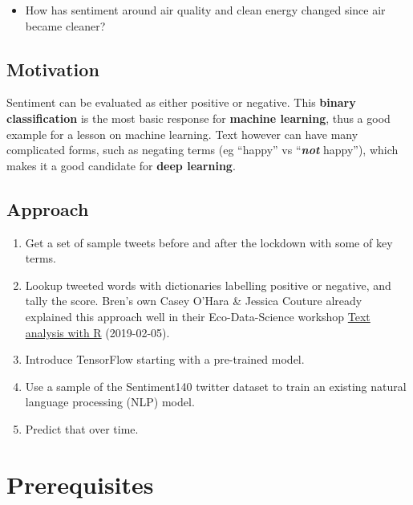 \documentclass[]{book}
\providecommand{\tightlist}{%
  \setlength{\itemsep}{0pt}\setlength{\parskip}{0pt}}
\begin{document}
\begin{itemize}
\tightlist
\item
  How has sentiment around air quality and clean energy changed since air became cleaner?
\end{itemize}

\hypertarget{motivation-1}{%
\subsection*{Motivation}\label{motivation-1}}

Sentiment can be evaluated as either positive or negative. This \textbf{binary classification} is the most basic response for \textbf{machine learning}, thus a good example for a lesson on machine learning. Text however can have many complicated forms, such as negating terms (eg ``happy'' vs ``\emph{\textbf{not}} happy''), which makes it a good candidate for \textbf{deep learning}.

\hypertarget{approach}{%
\subsection*{Approach}\label{approach}}

\begin{enumerate}
\def\labelenumi{\arabic{enumi}.}
\tightlist
\item
  Get a set of sample tweets before and after the lockdown with some of key terms.
\item
  Lookup tweeted words with dictionaries labelling positive or negative, and tally the score. Bren's own Casey O'Hara \& Jessica Couture already explained this approach well in their Eco-Data-Science workshop \href{https://github.com/oharac/text_workshop}{Text analysis with R} (2019-02-05).
\item
  Introduce TensorFlow starting with a pre-trained model.
\item
  Use a sample of the Sentiment140 twitter dataset to train an existing natural language processing (NLP) model.
\item
  Predict that over time.
\end{enumerate}

\hypertarget{prerequisites-2}{%
\section*{Prerequisites}\label{prerequisites-2}}
\end{document}
